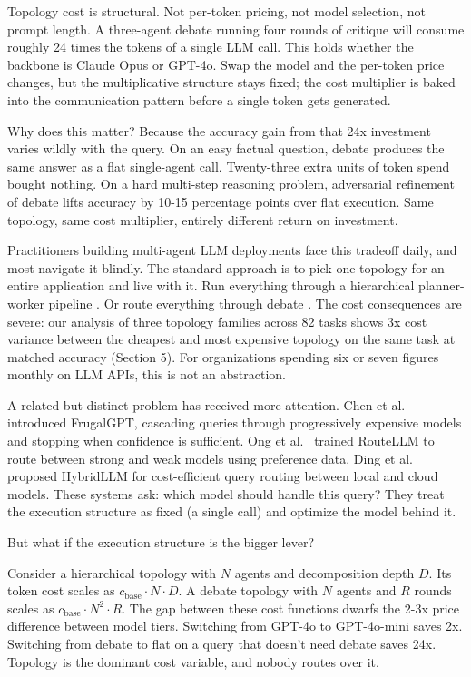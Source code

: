 Topology cost is structural. Not per-token pricing, not model selection, not prompt length. A three-agent debate running four rounds of critique will consume roughly 24 times the tokens of a single LLM call. This holds whether the backbone is Claude Opus or GPT-4o. Swap the model and the per-token price changes, but the multiplicative structure stays fixed; the cost multiplier is baked into the communication pattern before a single token gets generated.

Why does this matter? Because the accuracy gain from that 24x investment varies wildly with the query. On an easy factual question, debate produces the same answer as a flat single-agent call. Twenty-three extra units of token spend bought nothing. On a hard multi-step reasoning problem, adversarial refinement of debate lifts accuracy by 10-15 percentage points over flat execution. Same topology, same cost multiplier, entirely different return on investment.

Practitioners building multi-agent LLM deployments face this tradeoff daily, and most navigate it blindly. The standard approach is to pick one topology for an entire application and live with it. Run everything through a hierarchical planner-worker pipeline \cite{hong_2023}. Or route everything through debate \cite{wang_2024_moa}. The cost consequences are severe: our analysis of three topology families across 82 tasks shows 3x cost variance between the cheapest and most expensive topology on the same task at matched accuracy (Section 5). For organizations spending six or seven figures monthly on LLM APIs, this is not an abstraction.

A related but distinct problem has received more attention. Chen et al.~\cite{chen_2023} introduced FrugalGPT, cascading queries through progressively expensive models and stopping when confidence is sufficient. Ong et al.~\cite{ong_2025} trained RouteLLM to route between strong and weak models using preference data. Ding et al.~\cite{ding_2024} proposed HybridLLM for cost-efficient query routing between local and cloud models. These systems ask: which model should handle this query? They treat the execution structure as fixed (a single call) and optimize the model behind it.

But what if the execution structure is the bigger lever?

Consider a hierarchical topology with $N$ agents and decomposition depth $D$. Its token cost scales as $c_{\text{base}} \cdot N \cdot D$. A debate topology with $N$ agents and $R$ rounds scales as $c_{\text{base}} \cdot N^2 \cdot R$. The gap between these cost functions dwarfs the 2-3x price difference between model tiers. Switching from GPT-4o to GPT-4o-mini saves 2x. Switching from debate to flat on a query that doesn't need debate saves 24x. Topology is the dominant cost variable, and nobody routes over it.

